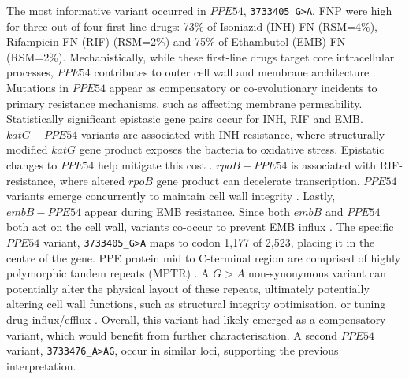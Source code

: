 The most informative variant occurred in $PPE54$, \texttt{3733405\_G>A}. FNP were high for three out of four first-line drugs: 73\% of Isoniazid (INH) FN (RSM=4\%), Rifampicin FN (RIF) (RSM=2\%) and 75\% of Ethambutol (EMB) FN (RSM=2\%). Mechanistically, while these first-line drugs target core intracellular processes, $PPE54$ contributes to outer cell wall and membrane architecture \cite{Tsolaki2022}. Mutations in $PPE54$ appear as compensatory or co-evolutionary incidents to primary resistance mechanisms, such as affecting membrane permeability. Statistically significant epistasic gene pairs occur for INH, RIF and EMB. $katG-PPE54$ variants are associated with INH resistance, where structurally modified $katG$ gene product exposes the bacteria to oxidative stress. Epistatic changes to $PPE54$ help mitigate this cost \cite{cui2016bioinformatics}. $rpoB-PPE54$ is associated with RIF-resistance, where altered $rpoB$ gene product can decelerate transcription. $PPE54$ variants emerge concurrently to maintain cell wall integrity \cite{cui2016bioinformatics}. Lastly, $embB-PPE54$ appear during EMB resistance. Since both $embB$ and $PPE54$ both act on the cell wall, variants co-occur to prevent EMB influx \cite{cui2016bioinformatics}. The specific $PPE54$ variant, \texttt{3733405\_G>A} maps to codon 1,177 of 2,523, placing it in the centre of the gene. PPE protein mid to C-terminal region are comprised of highly polymorphic tandem repeats (MPTR) \cite{Tsolaki2022}. A $G>A$ non-synonymous variant can potentially alter the physical layout of these repeats, ultimately potentially altering cell wall functions, such as structural integrity optimisation, or tuning drug influx/efflux \cite{Tsolaki2022, cui2016bioinformatics}. Overall, this variant had likely emerged as a compensatory variant, which would benefit from further characterisation. A second $PPE54$ variant, \texttt{3733476\_A>AG}, occur in similar loci, supporting the previous interpretation.

